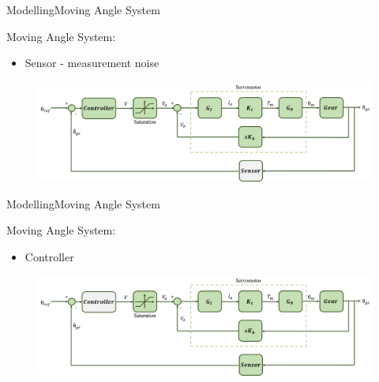 \begin{frame}{Modelling}{Moving Angle System}
  \begin{block}{Moving Angle System:}

	  \begin{itemize}
	  	\item Sensor - measurement noise	  
	  \end{itemize}

	  \begin{figure}
        \includegraphics[scale=0.24]{../report/figures/servo+gear+noise+sensor.png}
      \end{figure}
  
  \end{block}
\end{frame}


\begin{frame}{Modelling}{Moving Angle System}
  \begin{block}{Moving Angle System:}
	  \begin{itemize}
	  	\item Controller
	  \end{itemize}
	  \begin{figure}
        \includegraphics[scale=0.24]{../report/figures/servo+gear+noise+controller.png}
      \end{figure}
  \end{block}
\end{frame}

